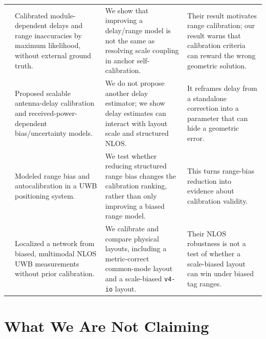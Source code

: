 \documentclass[11pt,a4paper]{article}
\begin{document}
\begin{center}
\begin{longtable}{@{}p{30mm}p{37mm}p{39mm}p{37mm}@{}}
\citet{ledergerber_2018_calibrating_away_inaccuracies_uwb} & Calibrated module-dependent delays and range inaccuracies by maximum likelihood, without external ground truth. & We show that improving a delay/range model is not the same as resolving scale coupling in anchor self-calibration. & Their result motivates range calibration; our result warns that calibration criteria can reward the wrong geometric solution. \\
\citet{shalaby_2023_calibration_and_uncertainty_char} & Proposed scalable antenna-delay calibration and received-power-dependent bias/uncertainty models. & We do not propose another delay estimator; we show delay estimates can interact with layout scale and structured NLOS. & It reframes delay from a standalone correction into a parameter that can hide a geometric error. \\
\citet{de_preter_2019_range_bias_modeling_autocalibration} & Modeled range bias and autocalibration in a UWB positioning system. & We test whether reducing structured range bias changes the calibration ranking, rather than only improving a biased range model. & This turns range-bias reduction into evidence about calibration validity. \\
\citet{difranco_2017_calibration_free_network_localization_nlos_uwb} & Localized a network from biased, multimodal NLOS UWB measurements without prior calibration. & We calibrate and compare physical layouts, including a metric-correct common-mode layout and a scale-biased \texttt{v4-io} layout. & Their NLOS robustness is not a test of whether a scale-biased layout can win under biased tag ranges. \\
\bottomrule
\end{longtable}
\end{center}

\section{What We Are Not Claiming}
\end{document}
